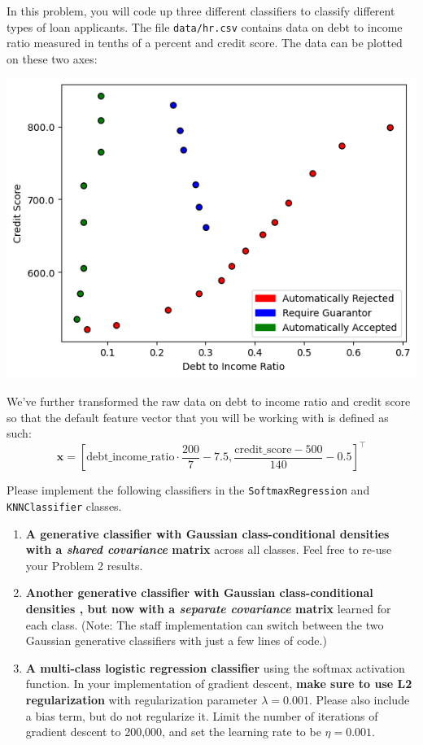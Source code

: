 \documentclass[submit]{../harvardml}
\begin{document}
\begin{problem}
In this problem, you will code up three different classifiers to classify different types of loan applicants. The file \verb|data/hr.csv| contains data on debt to income ratio measured in tenths of a percent and credit score. The data can be plotted on these two axes:
\begin{center}
  \includegraphics[width=.5\textwidth]{img_input/credit.png}
\end{center}
We've further transformed the raw data on debt to income ratio and credit score so that the default feature vector that you will be working with is defined as such:
\[\bm{x} = \left[\text{debt\_income\_ratio} \cdot \frac{200}{7}-7.5, \frac{\text{credit\_score}-500}{140}-0.5\right]^\top\]

\noindent Please implement the following classifiers in the \verb|SoftmaxRegression| and \verb|KNNClassifier| classes.


\begin{enumerate}[label=\alph*)]

  \item \textbf{A generative classifier with Gaussian class-conditional
          densities with a \textit{shared covariance} matrix} across all classes.
        Feel free to re-use your Problem 2 results.

  \item \textbf{Another generative classifier with Gaussian class-conditional densities , but now
          with a \textit{separate covariance} matrix} learned for each class. (Note:
        The staff implementation can switch between the two Gaussian generative classifiers with just a
        few lines of code.)

  \item \textbf{A multi-class logistic regression classifier} using the softmax activation function. In your implementation of gradient descent, \textbf{make sure to use L2 regularization} with regularization parameter $\lambda = 0.001$. Please also include a bias term, but do not regularize it. Limit the number of iterations of gradient descent to 200,000, and set the learning rate to be $\eta = 0.001$.


\end{enumerate}
\end{problem}
\end{document}
